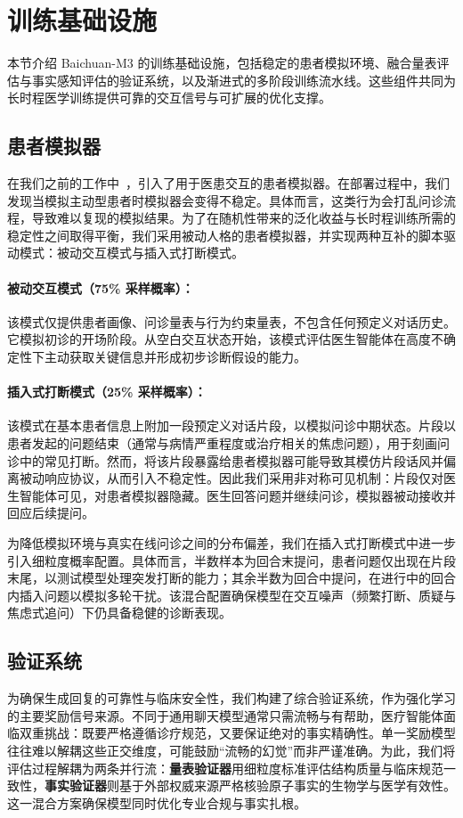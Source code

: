 \section{训练基础设施}
本节介绍 Baichuan-M3 的训练基础设施，包括稳定的患者模拟环境、融合量表评估与事实感知评估的验证系统，以及渐进式的多阶段训练流水线。这些组件共同为长时程医学训练提供可靠的交互信号与可扩展的优化支撑。

\subsection{患者模拟器}
在我们之前的工作中~\cite{baichuan-m2}，引入了用于医患交互的患者模拟器。在部署过程中，我们发现当模拟主动型患者时模拟器会变得不稳定。具体而言，这类行为会打乱问诊流程，导致难以复现的模拟结果。为了在随机性带来的泛化收益与长时程训练所需的稳定性之间取得平衡，我们采用被动人格的患者模拟器，并实现两种互补的脚本驱动模式：被动交互模式与插入式打断模式。

\paragraph{被动交互模式（75\% 采样概率）：}
该模式仅提供患者画像、问诊量表与行为约束量表，不包含任何预定义对话历史。它模拟初诊的开场阶段。从空白交互状态开始，该模式评估医生智能体在高度不确定性下主动获取关键信息并形成初步诊断假设的能力。


\paragraph{插入式打断模式（25\% 采样概率）：}
该模式在基本患者信息上附加一段预定义对话片段，以模拟问诊中期状态。片段以患者发起的问题结束（通常与病情严重程度或治疗相关的焦虑问题），用于刻画问诊中的常见打断。然而，将该片段暴露给患者模拟器可能导致其模仿片段话风并偏离被动响应协议，从而引入不稳定性。因此我们采用非对称可见机制：片段仅对医生智能体可见，对患者模拟器隐藏。医生回答问题并继续问诊，模拟器被动接收并回应后续提问。

为降低模拟环境与真实在线问诊之间的分布偏差，我们在插入式打断模式中进一步引入细粒度概率配置。具体而言，半数样本为回合末提问，患者问题仅出现在片段末尾，以测试模型处理突发打断的能力；其余半数为回合中提问，在进行中的回合内插入问题以模拟多轮干扰。该混合配置确保模型在交互噪声（频繁打断、质疑与焦虑式追问）下仍具备稳健的诊断表现。


\subsection{验证系统}
为确保生成回复的可靠性与临床安全性，我们构建了综合验证系统，作为强化学习的主要奖励信号来源。不同于通用聊天模型通常只需流畅与有帮助，医疗智能体面临双重挑战：既要严格遵循诊疗规范，又要保证绝对的事实精确性。单一奖励模型往往难以解耦这些正交维度，可能鼓励“流畅的幻觉”而非严谨准确。为此，我们将评估过程解耦为两条并行流：\textbf{量表验证器}用细粒度标准评估结构质量与临床规范一致性，\textbf{事实验证器}则基于外部权威来源严格核验原子事实的生物学与医学有效性。这一混合方案确保模型同时优化专业合规与事实扎根。

